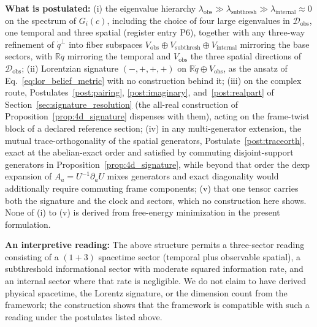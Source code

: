 \begin{center}
{\begin{minipage}{0.9\columnwidth}
\textbf{What is postulated:} (i) the eigenvalue hierarchy $\lambda_{\text{obs}} \gg \lambda_{\text{subthresh}} \gg \lambda_{\text{internal}} \approx 0$ on the spectrum of $G_i(c)$, including the choice of four large eigenvalues in $\mathcal{D}_{\text{obs}}$, one temporal and three spatial (register entry P6), together with any three-way refinement of $\dot{q}^\perp$ into fiber subspaces $V_{\text{obs}} \oplus V_{\text{subthresh}} \oplus V_{\text{internal}}$ mirroring the base sectors, with $\mathbb{R}\dot{q}$ mirroring the temporal and $V_{\text{obs}}$ the three spatial directions of $\mathcal{D}_{\text{obs}}$; (ii) Lorentzian signature $(-,+,+,+)$ on $\mathbb{R}\dot{q} \oplus V_{\text{obs}}$, as the ansatz of Eq.~\eqref{eq:lor_belief_metric} with no construction behind it; (iii) on the complex route, Postulates~\ref{post:pairing}, \ref{post:imaginary}, and~\ref{post:realpart} of Section~\ref{sec:signature_resolution} (the all-real construction of Proposition~\ref{prop:4d_signature} dispenses with them), acting on the frame-twist block of a declared reference section; (iv) in any multi-generator extension, the mutual trace-orthogonality of the spatial generators, Postulate~\ref{post:traceorth}, exact at the abelian-exact order and satisfied by commuting disjoint-support generators in Proposition~\ref{prop:4d_signature}, while beyond that order the $\mathrm{dexp}$ expansion of $A_a = U^{-1}\partial_a U$ mixes generators and exact diagonality would additionally require commuting frame components; (v) that one tensor carries both the signature and the clock and sectors, which no construction here shows. None of (i) to (v) is derived from free-energy minimization in the present formulation.

\textbf{An interpretive reading:} The above structure permits a three-sector reading consisting of a $(1+3)$ spacetime sector (temporal plus observable spatial), a subthreshold informational sector with moderate squared information rate, and an internal sector where that rate is negligible. We do not claim to have derived physical spacetime, the Lorentz signature, or the dimension count from the framework; the construction shows that the framework is compatible with such a reading under the postulates listed above.
\end{minipage}}
\end{center}
